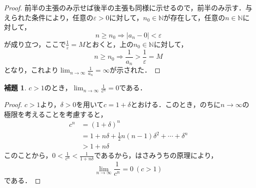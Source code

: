 \documentclass[dvipdfmx,uplatex,11pt]{jsarticle}
\theoremstyle{definition}
\newtheorem{lemm}{補題}[section]
\begin{document}
\begin{proof}
    前半の主張のみ示せば後半の主張も同様に示せるので，前半のみ示す．与えられた条件により，任意の$\varepsilon>0$に対して，$n_0 \in \mathbb{N}$が存在して，任意の$n \in \mathbb{N}$に対して，
    \[
        n \ge n_0 \Longrightarrow |a_n-0|<\varepsilon
    \]
    が成り立つ，ここで$\frac{1}{\varepsilon}=M$とおくと，上の$n_0 \in \mathbb{N}$に対して，
    \[
        n \ge n_0 \Longrightarrow \frac{1}{a_n} >\frac{1}{\varepsilon}=M
    \]
    となり，これより$\lim_{n \to \infty} \frac{1}{a_n}=\infty$が示された．
\end{proof}

\begin{lemm}
    \label{p31:問1.6.2}
    $c>1$のとき，$\lim_{n \to \infty} \frac{1}{c^n} = 0$である．
\end{lemm}

\begin{proof}
    $c>1$より，$\delta >0$を用いて$c=1+\delta$とおける．このとき，のちに$n \to \infty$の極限を考えることを考慮すると，
    \begin{align*}
        c^n &= (1+\delta)^n \\
        & = 1+n \delta +\frac{1}{2}n (n-1) \delta^2 + \cdots +\delta^n \\
        & > 1+n \delta
    \end{align*}
    このことから，$0<\frac{1}{c^n} <\frac{1}{1+n\delta}$であるから，はさみうちの原理により，
    \[
        \lim_{n \to \infty} \frac{1}{c^n} = 0~(c>1)
    \]
    である．
\end{proof}
\end{document}
